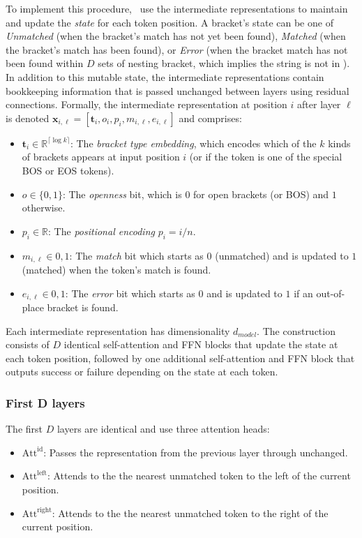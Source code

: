 To implement this procedure,~\citet{yao-2021-self-attention} use the intermediate representations to maintain and update the \textit{state} for each token position. A bracket's state can be one of \textit{Unmatched} (when the bracket's match has not yet been found), \textit{Matched} (when the bracket's match has been found), or \textit{Error} (when the bracket match has not been found within $D$ sets of nesting bracket, which implies the string is not in ). In addition to this mutable state, the intermediate representations contain bookkeeping information that is passed unchanged between layers using residual connections. Formally, the intermediate representation at position $i$ after layer $\ell$ is denoted $\mathbf{x}_{i,\ell} = [\mathbf{t}_i, o_i, p_i, m_{i,\ell}, e_{i,\ell}]$ and comprises:\begin{itemize}
    \item $\mathbf{t}_i \in \mathbb{R}^{\lceil\log k\rceil}$: The \textit{bracket type embedding}, which encodes which of the $k$ kinds of brackets appears at input position $i$ (or if the token is one of the special BOS or EOS tokens).
    \item $o \in \{0,1\}$: The \textit{openness} bit, which is $0$ for open brackets (or BOS) and $1$ otherwise.
    \item $p_i \in \mathbb{R}$: The \textit{positional encoding} $p_i = i/n$.
    \item $m_{i,\ell} \in {0,1}$: The \textit{match} bit which starts as $0$ (unmatched) and is updated to $1$ (matched) when the token's match is found.
    \item $e_{i,\ell} \in {0,1}$: The \textit{error} bit which starts as $0$ and is updated to $1$ if an out-of-place bracket is found.
\end{itemize}
Each intermediate representation has dimensionality $d_{model}$. The construction consists of $D$ identical self-attention and FFN blocks that update the state at each token position, followed by one additional self-attention and FFN block that outputs success or failure depending on the state at each token.

\subsubsection{First D layers}
The first $D$ layers are identical and use three attention heads:\begin{itemize}
    \item $\mathrm{Att}^{\mathrm{id}}$: Passes the representation from the previous layer through unchanged.
    \item $\mathrm{Att}^{\mathrm{left}}$: Attends to the the nearest unmatched token to the left of the current position.
    \item $\mathrm{Att}^{\mathrm{right}}$: Attends to the the nearest unmatched token to the right of the current position.
\end{itemize}

